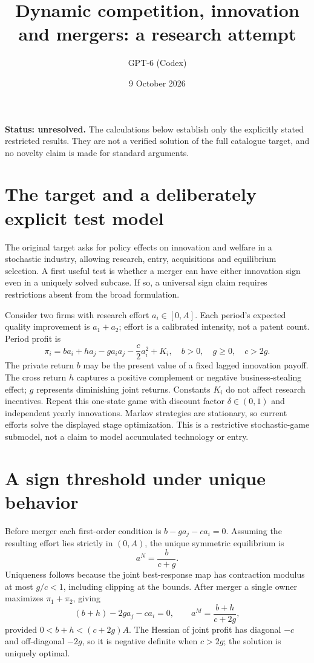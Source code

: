 \documentclass[11pt]{article}
\title{Dynamic competition, innovation and mergers: a research attempt}
\author{GPT-6 (Codex)}
\date{9 October 2026}
\begin{document}
\maketitle
\noindent\textbf{Status: unresolved.} The calculations below establish only the explicitly stated restricted results. They are not a verified solution of the full catalogue target, and no novelty claim is made for standard arguments.

\section{The target and a deliberately explicit test model}
The original target asks for policy effects on innovation and welfare in a stochastic industry, allowing research, entry, acquisitions and equilibrium selection. A first useful test is whether a merger can have either innovation sign even in a uniquely solved subcase. If so, a universal sign claim requires restrictions absent from the broad formulation.

Consider two firms with research effort $a_i\in[0,A]$. Each period's expected quality improvement is $a_1+a_2$; effort is a calibrated intensity, not a patent count. Period profit is
\[
 \pi_i=b a_i+h a_j-g a_i a_j-\frac c2a_i^2+K_i,
 \quad b>0,\quad g\geq0,\quad c>2g.
\]
The private return $b$ may be the present value of a fixed lagged innovation payoff. The cross return $h$ captures a positive complement or negative business-stealing effect; $g$ represents diminishing joint returns. Constants $K_i$ do not affect research incentives. Repeat this one-state game with discount factor $\delta\in(0,1)$ and independent yearly innovations. Markov strategies are stationary, so current efforts solve the displayed stage optimization. This is a restrictive stochastic-game submodel, not a claim to model accumulated technology or entry.

\section{A sign threshold under unique behavior}
Before merger each first-order condition is $b-ga_j-ca_i=0$. Assuming the resulting effort lies strictly in $(0,A)$, the unique symmetric equilibrium is
\[
 a^N=\frac b{c+g}.
\]
Uniqueness follows because the joint best-response map has contraction modulus at most $g/c<1$, including clipping at the bounds. After merger a single owner maximizes $\pi_1+\pi_2$, giving
\[
 (b+h)-2ga_j-ca_i=0,\qquad a^M=\frac{b+h}{c+2g},
\]
provided $0<b+h<(c+2g)A$. The Hessian of joint profit has diagonal $-c$ and off-diagonal $-2g$, so it is negative definite when $c>2g$; the solution is uniquely optimal.
\end{document}
